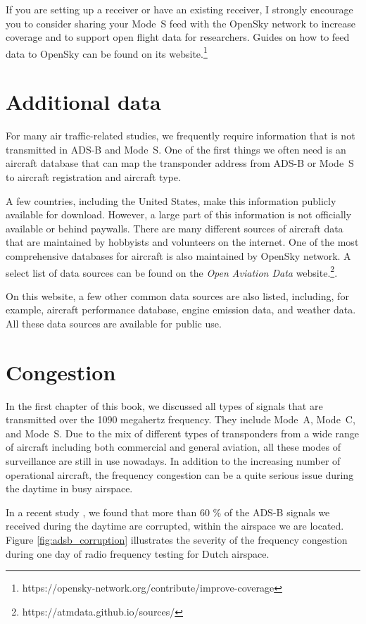 If you are setting up a receiver or have an existing receiver, I strongly encourage you to consider sharing your Mode~S feed with the OpenSky network to increase coverage and to support open flight data for researchers. Guides on how to feed data to OpenSky can be found on its website.\footnote{https://opensky-network.org/contribute/improve-coverage}

\section{Additional data}

For many air traffic-related studies, we frequently require information that is not transmitted in ADS-B and Mode~S. One of the first things we often need is an aircraft database that can map the transponder address from ADS-B or Mode~S to aircraft registration and aircraft type. 

A few countries, including the United States, make this information publicly available for download. However, a large part of this information is not officially available or behind paywalls. There are many different sources of aircraft data that are maintained by hobbyists and volunteers on the internet. One of the most comprehensive databases for aircraft is also maintained by OpenSky network. A select list of data sources can be found on the \emph{Open Aviation Data} website.\footnote{https://atmdata.github.io/sources/}.

On this website, a few other common data sources are also listed, including, for example, aircraft performance database, engine emission data, and weather data. All these data sources are available for public use.


\section{Congestion}
In the first chapter of this book, we discussed all types of signals that are transmitted over the 1090 megahertz frequency. They include Mode~A, Mode~C, and Mode~S. Due to the mix of different types of transponders from a wide range of aircraft including both commercial and general aviation, all these modes of surveillance are still in use nowadays. In addition to the increasing number of operational aircraft, the frequency congestion can be a quite serious issue during the daytime in busy airspace. 

In a recent study \cite{sun2020rf}, we found that more than 60 \% of the ADS-B signals we received during the daytime are corrupted, within the airspace we are located. Figure \ref{fig:adsb_corruption} illustrates the severity of the frequency congestion during one day of radio frequency testing for Dutch airspace.


